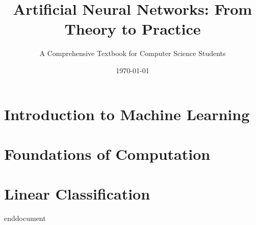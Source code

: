 \documentclass{book}
\title{Artificial Neural Networks: From Theory to Practice}
\author{A Comprehensive Textbook for Computer Science Students}
\date{\today}
\begin{document}
\maketitle
\tableofcontents

\chapter{Introduction to Machine Learning}


\chapter{Foundations of Computation}


\chapter{Linear Classification}
end{document}
\end{document}
